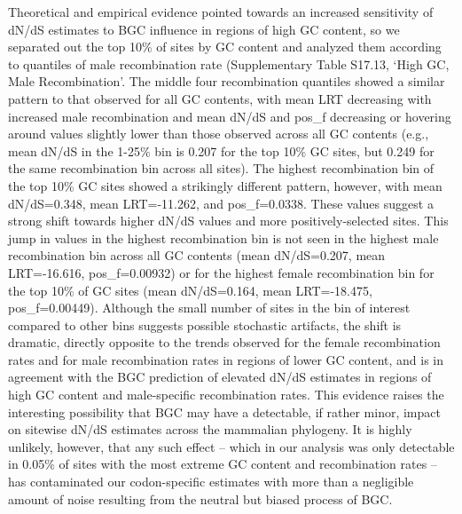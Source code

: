 Theoretical and empirical evidence pointed towards an increased
sensitivity of dN/dS estimates to BGC influence in regions of high GC
content, so we separated out the top 10\% of sites by GC content and
analyzed them according to quantiles of male recombination rate
(Supplementary Table S17.13, ‘High GC, Male Recombination’. The middle
four recombination quantiles showed a similar pattern to that observed
for all GC contents, with mean LRT decreasing with increased male
recombination and mean dN/dS and pos_f decreasing or hovering around
values slightly lower than those observed across all GC contents
(e.g., mean dN/dS in the 1-25\% bin is 0.207 for the top 10\% GC
sites, but 0.249 for the same recombination bin across all sites). The
highest recombination bin of the top 10\% GC sites showed a strikingly
different pattern, however, with mean dN/dS=0.348, mean LRT=-11.262,
and pos_f=0.0338. These values suggest a strong shift towards higher
dN/dS values and more positively-selected sites. This jump in values
in the highest recombination bin is not seen in the highest male
recombination bin across all GC contents (mean dN/dS=0.207, mean
LRT=-16.616, pos_f=0.00932) or for the highest female recombination
bin for the top 10\% of GC sites (mean dN/dS=0.164, mean LRT=-18.475,
pos_f=0.00449). Although the small number of sites in the bin of
interest compared to other bins suggests possible stochastic
artifacts, the shift is dramatic, directly opposite to the trends
observed for the female recombination rates and for male recombination
rates in regions of lower GC content, and is in agreement with the BGC
prediction of elevated dN/dS estimates in regions of high GC content
and male-specific recombination rates. This evidence raises the
interesting possibility that BGC may have a detectable, if rather
minor, impact on sitewise dN/dS estimates across the mammalian
phylogeny. It is highly unlikely, however, that any such effect --
which in our analysis was only detectable in 0.05\% of sites with the
most extreme GC content and recombination rates -- has contaminated
our codon-specific estimates with more than a negligible amount of
noise resulting from the neutral but biased process of BGC.


